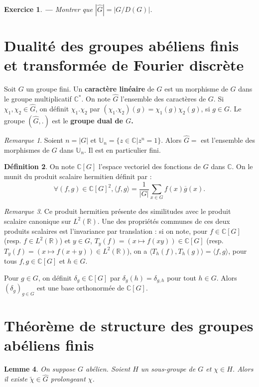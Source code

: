 \documentclass[a4paper]{article}
\newcounter{question}
\newtheorem{enonce}{Exercice}
\newenvironment{exo}[0]{\begin{enonce}{\bf ---}\rm\setcounter{question}{1}}{\end{enonce}}
\theoremstyle{definition} %
\newtheorem{Def}{Définition}[section] %
\theoremstyle{plain} %
\newtheorem{Lem}[Def]{Lemme} %
\theoremstyle{remark} %
\newtheorem{Rq}[Def]{Remarque} %
\newcommand{\C}{\mathbb{C}}
\newcommand{\R}{\mathbb{R}}
\newcommand{\wg}{\widehat{G}}
\begin{document}
\begin{exo}
Montrer que $|\widehat{G}|=|G/D(G)|$.
\end{exo}

\section{Dualité des groupes abéliens finis et transformée de Fourier discrète}

Soit $G$ un groupe fini. Un \textbf{caractère linéaire} de $G$ est un morphisme de $G$ dans le groupe multiplicatif $\C^*$. On note $\widehat{G}$ l'ensemble des caractères de $G$. Si $\chi_1,\chi_2\in \wg$, on définit $\chi_1.\chi_2$ par $(\chi_1.\chi_2)(g)=\chi_1(g)\chi_2(g)$, si $g\in G$. Le groupe $(\wg,.)$ est le \textbf{groupe dual de $G$.}

\begin{Rq}
Soient $n=|G|$ et $\mathbb{U}_n=\{z\in \C|z^n=1\}$. Alors $\wg=$ est l'ensemble des morphismes de $G$ dans $\mathbb{U}_n$. Il est en particulier fini.
\end{Rq}

\begin{Def}
On note $\C[G]$ l'espace vectoriel des fonctions de $G$ dans $\C$. On le munit du produit scalaire hermitien définit par : \[\forall(f,g)\in \C[G]^2,\langle f,g\rangle=\frac{1}{|G|}\sum_{x\in G}f(x)\overline{g}(x).\]
\end{Def}

\begin{Rq}
Ce produit hermitien présente des similitudes avec le produit scalaire canonique sur $L^2(\R)$. Une des propriétés communes de ces deux produits scalaires est l'invariance par translation : si on note, pour $f\in \C[G]$ (resp. $f\in L^2(\R)$) et $y\in G$, $T_y(f)=(x\mapsto f(xy))\in \C[G]$ (resp. $T_y(f)=(x\mapsto f(x+y))\in L^2(\R)$), on a $\langle T_h(f),T_h(g)\rangle=\langle f,g\rangle$, pour tous $f,g\in \C[G]$ et $h\in G$.
\end{Rq}


Pour $g\in G$, on définit $\delta_g\in \C[G]$ par $\delta_g(h)=\delta_{g,h}$ pour tout $h\in G$. Alors $(\delta_g)_{g\in G}$ est une base orthonormée de $\C[G]$.


\section{Théorème de structure des groupes abéliens finis}
\begin{Lem}\label{lemProlongement_caractères}
On suppose $G$ abélien. Soient $H$ un sous-groupe de $G$ et $\chi\in \widehat{H}$. Alors il existe $\widetilde{\chi}\in \wg$ prolongeant $\chi$.
\end{Lem}
\end{document}
